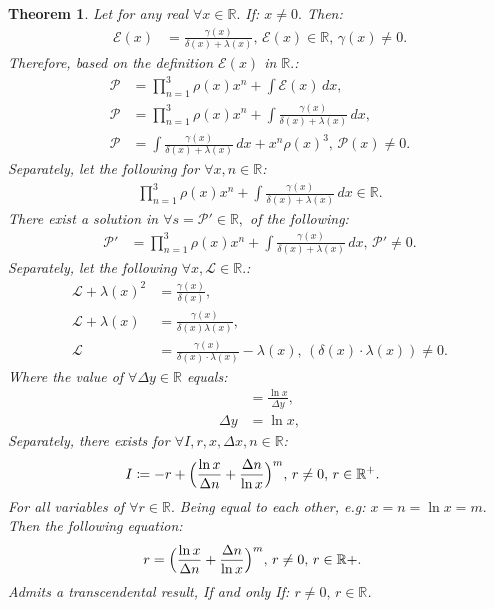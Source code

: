 \documentclass[10pt]{article}
\theoremstyle{plain}
\newtheorem{theorem}{Theorem}[section]
\theoremstyle{definition}
\theoremstyle{remark}
\begin{document}
\begin{theorem}
	Let for any real $\forall x \in \mathbb{R}.$ If: $x \neq 0.$ Then:
	\begin{align*}
		\mathcal{E}(x) &= \frac{\gamma(x)}{\delta(x) + \lambda(x)}, \, \mathcal{E}(x) \in \mathbb{R}, \, \gamma(x) \neq 0.
	\end{align*}
	Therefore, based on the definition $\mathcal{E}(x)$ in $\mathbb{R}.$:
	\begin{align*}
		\mathcal{P} &= \prod_{n=1}^{3}\rho(x) x^{n} + \int \mathcal{E}(x) \, dx,\\
		\mathcal{P} &= \prod_{n=1}^{3}\rho(x) x^{n} + \int \frac{\gamma(x)}{\delta(x) + \lambda(x)} \, dx,\\
		\mathcal{P} &= \int \frac{\gamma(x)}{\delta(x) + \lambda(x)} \, dx + x^{n} \rho(x)^{3}, \, \mathcal{P}(x) \neq 0.
	\end{align*}
	Separately, let the following for $\forall x, n \in \mathbb{R}$:
	\begin{align*}
		\prod_{n=1}^{3}\rho(x) x^{n} + \int \frac{\gamma(x)}{\delta(x) + \lambda(x)} \, dx \in \mathbb{R}.
	\end{align*}
	There exist a solution in $\forall s = \mathcal{P}' \in \mathbb{R},$ of the following:
	\begin{align*}
		\mathcal{P}' &= \prod_{n=1}^{3}\rho(x) x^{n} + \int \frac{\gamma(x)}{\delta(x) + \lambda(x)} \, dx, \, \mathcal{P}' \neq 0.
	\end{align*}
	Separately, let the following $\forall x, \mathcal{L} \in \mathbb{R}.$:
	\begin{align*}
		\mathcal{L} + \lambda(x)^{2} &= \frac{\gamma(x)}{\delta(x)},\\
	 	\mathcal{L} + \lambda(x) &= \frac{\gamma(x)}{\delta(x)  \lambda(x) },\\
	 	\mathcal{L} &= \frac{\gamma(x)}{\delta(x) \cdot \lambda(x) } - \lambda(x), \, (\delta(x) \cdot \lambda(x)) \neq 0.
	\end{align*}
	Where the value of $\forall \Delta y \in \mathbb{R}$ equals:
	\begin{align*}
		&= \frac{\ln x}{\Delta y},\\
		\Delta y &= \ln x,
	\end{align*}
	Separately, there exists for $\forall I, r, x, \Delta x, n \in \mathbb{R}$:
	\begin{align*}
		I &\coloneq -r + \Bigl( \frac{\ln x}{\Delta n} + \frac{\Delta n}{\ln x}\Bigr)^m, \, r \neq 0, \, r \in \mathbb{R}^{+}.
	\end{align*}
	For all variables of $\forall r \in \mathbb{R}.$ Being equal to each other, e.g: $x = n = \ln x = m.$ Then the following equation:
	\begin{align*}
		r &= \Bigl( \frac{\ln x}{\Delta n} + \frac{\Delta n}{\ln x}\Bigr)^m, \, r \neq 0, \, r \in \mathbb{R}{+}.
	\end{align*}
	Admits a transcendental result, If and only If: $r \neq 0, \, r \in \mathbb{R}$.
\end{theorem}
\end{document}
